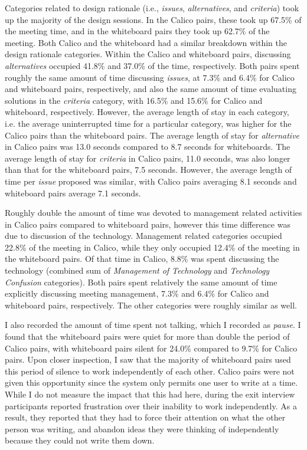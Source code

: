 \documentclass[12pt,fleqn]{ucithesis}
\begin{document}
Categories related to design rationale (i.e., \emph{issues}, \emph{alternatives}, and \emph{criteria}) took up the majority of the design sessions. In the Calico pairs, these took up 67.5\% of the meeting time, and in the whiteboard pairs they took up 62.7\% of the meeting. Both Calico and the whiteboard had a similar breakdown within the design rationale categories. Within the Calico and whiteboard pairs, discussing \emph{alternatives} occupied 41.8\% and 37.0\% of the time, respectively. Both pairs spent roughly the same amount of time discussing \emph{issues}, at 7.3\% and 6.4\% for Calico and whiteboard pairs, respectively, and also the same amount of time evaluating solutions in the \emph{criteria} category, with 16.5\% and 15.6\% for Calico and whiteboard, respectively. However, the average length of stay in each category, i.e. the average uninterrupted time for a particular category, was higher for the Calico pairs than the whiteboard pairs. The average length of stay for \emph{alternative} in Calico pairs was 13.0 seconds compared to 8.7 seconds for whiteboards. The average length of stay for \emph{criteria} in Calico pairs, 11.0 seconds, was also longer than that for the whiteboard pairs, 7.5 seconds. However, the average length of time per \emph{issue} proposed was similar, with Calico pairs averaging 8.1 seconds and whiteboard pairs average 7.1 seconds.

Roughly double the amount of time was devoted to management related activities in Calico pairs compared to whiteboard pairs, however this time difference was due to discussion of the technology. Management related categories occupied 22.8\% of the meeting in Calico, while they only occupied 12.4\% of the meeting in the whiteboard pairs. Of that time in Calico, 8.8\% was spent discussing the technology (combined sum of \emph{Management of Technology} and \emph{Technology Confusion} categories). Both pairs spent relatively the same amount of time explicitly discussing meeting management, 7.3\% and 6.4\% for Calico and whiteboard pairs, respectively. The other categories were roughly similar as well.

I also recorded the amount of time spent not talking, which I recorded as \emph{pause}. I found that the whiteboard pairs were quiet for more than double the period of Calico pairs, with whiteboard pairs silent for 24.0\% compared to 9.7\% for Calico pairs. Upon closer inspection, I saw that the majority of whiteboard pairs used this period of silence to work independently of each other. Calico pairs were not given this opportunity since the system only permits one user to write at a time. While I do not measure the impact that this had here, during the exit interview participants reported frustration over their inability to work independently. As a result, they reported that they had to force their attention on what the other person was writing, and abandon ideas they were thinking of independently because they could not write them down.
\end{document}
